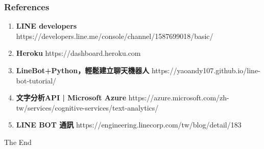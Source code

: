 \documentclass{beamer}
\begin{document}
\begin{CJK}{UTF8}{<font>}

\begin{frame}
\frametitle{References}


\begin{enumerate} 
	\item \textbf {LINE developers} \newline
	https://developers.line.me/console/channel/1587699018/basic/
	\item  \textbf {Heroku} \newline
	https://dashboard.heroku.com
	\item \textbf {LineBot+Python，輕鬆建立聊天機器人} \newline
	https://yaoandy107.github.io/line-bot-tutorial/  
	\item  \textbf {文字分析API | Microsoft Azure}  \newline
	https://azure.microsoft.com/zh-tw/services/cognitive-services/text-analytics/
	\item  \textbf { LINE BOT 通訊}  \newline
	https://engineering.linecorp.com/tw/blog/detail/183
\end{enumerate}
\end{frame}


\begin{frame}
\Huge{\centerline{The End}}
\end{frame}

\end{CJK}
\end{document}
